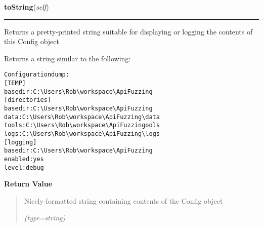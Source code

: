     \label{morpher:misc:config:Config:toString}

    \vspace{0.5ex}

\hspace{.8\funcindent}\begin{boxedminipage}{\funcwidth}

    \raggedright \textbf{toString}(\textit{self})

    \vspace{-1.5ex}

    \rule{\textwidth}{0.5\fboxrule}
\setlength{\parskip}{2ex}
    Returns a pretty-printed string suitable for displaying or logging the 
    contents of this Config object

    Returns a string similar to the following:

\begin{alltt}
   Configuration dump: 
   [TEMP]
     basedir : C:{\textbackslash}Users{\textbackslash}Rob{\textbackslash}workspace{\textbackslash}ApiFuzzing
   [directories]
     basedir : C:{\textbackslash}Users{\textbackslash}Rob{\textbackslash}workspace{\textbackslash}ApiFuzzing
     data : C:{\textbackslash}Users{\textbackslash}Rob{\textbackslash}workspace{\textbackslash}ApiFuzzing{\textbackslash}data
     tools : C:{\textbackslash}Users{\textbackslash}Rob{\textbackslash}workspace{\textbackslash}ApiFuzzing ools
     logs : C:{\textbackslash}Users{\textbackslash}Rob{\textbackslash}workspace{\textbackslash}ApiFuzzing{\textbackslash}logs
   [logging]
     basedir : C:{\textbackslash}Users{\textbackslash}Rob{\textbackslash}workspace{\textbackslash}ApiFuzzing
     enabled : yes
     level : debug\end{alltt}

\setlength{\parskip}{1ex}
      \textbf{Return Value}
    \vspace{-1ex}

      \begin{quote}
      Nicely-formatted string containing contents of the Config object

      {\it (type=string)}

      \end{quote}

    \end{boxedminipage}


